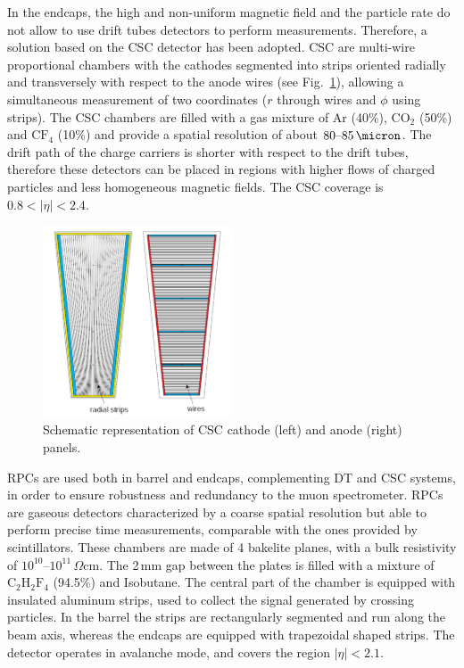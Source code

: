 In the endcaps, the high and non-uniform magnetic field and the particle rate do not allow to use drift tubes detectors to perform measurements. Therefore, a solution based on the CSC detector has been adopted. CSC are multi-wire proportional chambers with the cathodes segmented into strips oriented radially and transversely with respect to the anode wires (see Fig.~\ref{fig:csc}), allowing a simultaneous measurement of two coordinates ($r$ through wires and $\phi$ using strips). The CSC chambers are filled with a gas mixture of Ar (40\%), $\mathrm{CO_2}$ (50\%) and $\mathrm{CF_4}$ (10\%) and provide a spatial resolution of about $80\mbox{--}85\,\micron$.
The drift path of the charge carriers is shorter with respect to the drift tubes, therefore these detectors can be placed in regions with higher flows of charged particles and less homogeneous magnetic fields. The CSC coverage is $0.8 < |\eta| < 2.4$.
\begin{figure}[htb]
\centering
\includegraphics[width=0.5\textwidth]{images/csc.png}
\caption{Schematic representation of CSC cathode (left) and anode (right) panels.}\label{fig:csc}
\end{figure}

RPCs are used both in barrel and endcaps, complementing DT and CSC systems, in order to ensure robustness and redundancy to the muon spectrometer.
RPCs are gaseous detectors characterized by a coarse spatial resolution but able to perform precise time measurements, comparable with the ones provided by scintillators. These chambers are made of 4 bakelite planes, with a bulk resistivity of $10^{10}\mbox{--}10^{11}\,\Omega$cm. The 2\,mm gap between the plates is filled with a mixture of $\mathrm{C_2 H_2 F_4}$ (94.5\%) and Isobutane. 
The central part of the chamber is equipped with insulated aluminum strips, used to collect the signal generated by crossing particles. In the barrel the strips are rectangularly segmented and run along the beam axis, whereas the endcaps are equipped with trapezoidal shaped strips. The detector operates in avalanche mode, and covers the region $|\eta|<2.1$.

